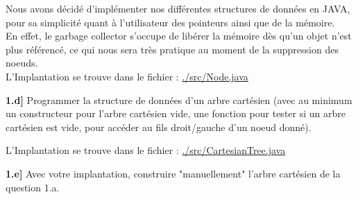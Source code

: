 \documentclass[a4paper,12pt]{report}
\begin{document}
\begin{tcolorbox}[colback=gray!10, colframe=blue!30, coltitle=black, title=Réponse à la 1.c - 1/1]

    Nous avons décidé d'implémenter nos différentes structures de données en JAVA, pour sa simplicité quant à l'utilisateur des pointeurs ainsi que de la mémoire.\\

    En effet, le garbage collector s'occupe de libérer la mémoire dès qu'un objet n'est plus référencé, ce qui nous sera très pratique au moment de la 
        suppression des noeuds.\\

    L'Implantation se trouve dans le fichier : \href{./src/Node.java}{./src/Node.java}

\end{tcolorbox}




\vspace{1.5cm}

\textbf{1.d]} Programmer la structure de données d'un arbre cartésien (avec au minimum un constructeur pour l'arbre cartésien vide, une fonction pour 
    tester si un arbre cartésien est vide, pour accéder au fils droit/gauche d'un noeud donné).



\begin{tcolorbox}[colback=gray!10, colframe=blue!30, coltitle=black, title=Réponse à la 1.d - 1/1]

    L'Implantation se trouve dans le fichier : \href{./src/CartesianTree.java}{./src/CartesianTree.java}

\end{tcolorbox}




\vspace{1.5cm}

\textbf{1.e]} Avec votre implantation, construire "manuellement" l'arbre cartésien de la question 1.a.
\end{document}
